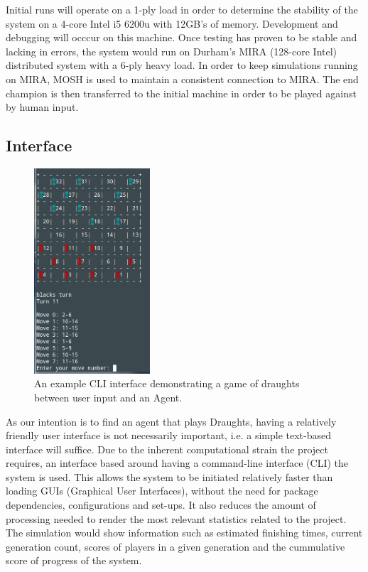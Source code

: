 \documentclass[12pt,a4paper]{article}
\begin{document}
    Initial runs will operate on a 1-ply load in order to determine the stability of the system on a 4-core Intel i5 6200u with 12GB's of memory. Development and debugging will occcur on this machine. Once testing has proven to be stable and lacking in errors, the system would run on Durham's MIRA (128-core Intel) distributed system with a 6-ply heavy load. In order to keep simulations running on MIRA, MOSH is used to maintain a consistent  connection to MIRA. The end champion is then transferred to the initial machine in order to be played against by human input.


\subsection*{Interface}

    \begin{figure}
        \vspace{-30pt}
        \centering
        \caption{An example CLI interface demonstrating a game of draughts between user input and an Agent. \label{cli_humaninput}}
        \includegraphics[width=43mm]{cli_humanvsagent.png}
        \vspace{-20pt}
    \end{figure}

    As our intention is to find an agent that plays Draughts, having a relatively friendly user interface is not necessarily important, i.e. a simple text-based interface will suffice. Due to the inherent computational strain the project requires, an interface based around having a command-line interface (CLI) the system is used. This allows the system to be initiated relatively faster than loading GUIs (Graphical User Interfaces), without the need for package dependencies, configurations and set-ups. It also reduces the amount of processing needed to render the most relevant statistics related to the project. The simulation would show information such as estimated finishing times, current generation count, scores of players in a given generation and the cummulative score of progress of the system.
\end{document}
